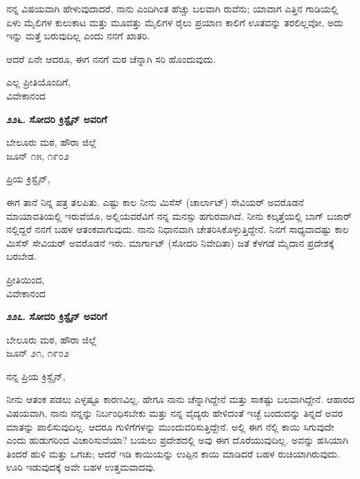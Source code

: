 ನನ್ನ ವಿಷಯವಾಗಿ ಹೇಳುವುದಾದರೆ, ನಾನು ಎಂದಿಗಿಂತ ಹೆಚ್ಚು ಬಲವಾಗಿ ರುವೆನು; ಯಾವಾಗ ಎತ್ತಿನ ಗಾಡಿಯಲ್ಲಿ ಏಳು ಮೈಲಿಗಳ ಕುಲುಕಾಟ ಮತ್ತು ಮೂವತ್ತು ಮೈಲಿಗಳ ರೈಲು ಪ್ರಯಾಣ ಕಾಲಿಗೆ ಊತವನ್ನು ತರಲಿಲ್ಲವೋ, ಅದು ಇನ್ನು ಮತ್ತೆ ಬರುವುದಿಲ್ಲ ಎಂದು ನನಗೆ ಖಾತರಿ.

ಆದರೆ ಏನೇ ಆದರೂ, ಈಗ ನನಗೆ ಮಠ ಚೆನ್ನಾಗಿ ಸರಿ ಹೊಂದುವುದು.

\begin{flushright}
ಎಲ್ಲ ಪ್ರೀತಿಯೊಂದಿಗೆ,\\ವಿವೇಕಾನಂದ
\end{flushright}

\begin{center}
\textbf{೨೨೬. ಸೋದರಿ ಕ್ರಿಸ್ಟೈನ್ ಅವರಿಗೆ}
\end{center}

\begin{flushright}
ಬೇಲೂರು ಮಠ, ಹೌರಾ ಜಿಲ್ಲೆ\\ಜೂನ್ ೧೫, ೧೯೦೨
\end{flushright}

ಪ್ರಿಯ ಕ್ರಿಸ್ಟೈನ್,

ಈಗ ತಾನೆ ನಿನ್ನ ಪತ್ರ ತಲಪಿತು. ಎಷ್ಟು ಕಾಲ ನೀನು ಮಿಸೆಸ್ (ಚಾರ್ಲಾಟ್) ಸೇವಿಯರ್ ಅವರೊಡನೆ ಮಾಯಾವತಿಯಲ್ಲಿ ಇರುವೆಯೊ, ಅಲ್ಲಿಯವರೆವಿಗೆ ನನ್ನ ಮನಸ್ಸು ಹಗುರವಾಗಿದೆ. ನೀನು ಕಲ್ಕತ್ತೆಯಲ್ಲಿ ಬಾಗ್ ಬಜಾರ್ ನಲ್ಲಿದ್ದರೆ ನನಗೆ ಬಹಳ ಆತಂಕವಾಗುವುದು. ನಾನು ನಿಧಾನವಾಗಿ ಚೇತರಿಸಿಕೊಳ್ಳುತ್ತಿದ್ದೇನೆ. ನಿನಗೆ ಸಾಧ್ಯವಾದಷ್ಟು ಕಾಲ ಮಿಸೆಸ್ ಸೇವಿಯರ್ ಅವರೊಡನೆ ಇರು. ಮಾರ್ಗಾಟ್ (ಸೋದರಿ ನಿವೇದಿತಾ) ಜತೆ ಕೆಳಗಡೆ ಮೈದಾನ ಪ್ರದೇಶಕ್ಕೆ ಬರಬೇಡ.

\begin{flushright}
ಪ್ರೀತಿಯಿಂದ,\\ವಿವೇಕಾನಂದ
\end{flushright}

\begin{center}
\textbf{೨೨೭. ಸೋದರಿ ಕ್ರಿಸ್ಟೈನ್ ಅವರಿಗೆ}
\end{center}

\begin{flushright}
ಬೇಲೂರು ಮಠ, ಹೌರಾ ಜಿಲ್ಲೆ\\ಜೂನ್ ೨೧, ೧೯೦೨
\end{flushright}

ನನ್ನ ಪ್ರಿಯ ಕ್ರಿಸ್ಟೈನ್,

ನೀನು ಆತಂಕ ಪಡಲು ಎಳ್ಳಷ್ಟೂ ಕಾರಣವಿಲ್ಲ. ಹೇಗೂ ನಾನು ಚೆನ್ನಾಗಿದ್ದೇನೆ ಮತ್ತು ಸಾಕಷ್ಟು ಬಲವಾಗಿದ್ದೇನೆ. ಆಹಾರದ ವಿಷಯವಾಗಿ, ನಾನು ನನ್ನನ್ನು ನಿರ್ಬಂಧಿಸಬೇಕು ಮತ್ತು ನನ್ನ ವೈದ್ಯರು ಹೇಳಿದಂತೆ ಇಚ್ಛೆ ಬಂದುದನ್ನು ತಿನ್ನದೆ ಅವರ ಮಾತನ್ನು ಪಾಲಿಸುವುದಿಲ್ಲ. ಆದರೂ ಗುಳಿಗೆಗಳನ್ನು ಮುಂದುವರಿಸುತ್ತಿದ್ದೇನೆ. ಅಲ್ಲಿ ಈಗ ನೆಲ್ಲಿ ಕಾಯಿ ಸಿಗುವುದೇ ಎಂದು ಹುಡುಗರಿಂದ ವಿಚಾರಿಸುವೆಯಾ? ಬಯಲು ಪ್ರದೇಶದಲ್ಲಿ ಅವು ಈಗ ದೊರೆಯುವುದಿಲ್ಲ. ಅವನ್ನು ಹಸಿಯಾಗಿ ತಿಂದರೆ ಹುಳಿ ಮತ್ತು ಒಗಚು; ಆದರೆ ಇಡಿ ಕಾಯಿಯನ್ನು ಉಪ್ಪಿನ ಕಾಯಿ ಮಾಡಿದರೆ ಬಹಳ ರುಚಿಯಾಗಿರುವುದು. ಊರಿ ಇಡುವುದಕ್ಕೆ ಅವೇ ಬಹಳ ಉತ್ತಮವಾದವು.

